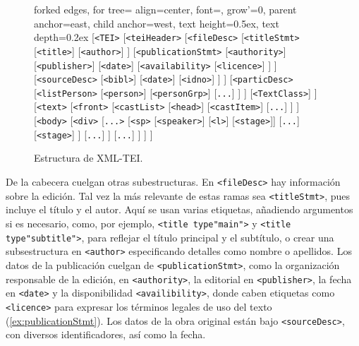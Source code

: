 	\begin{figure}[!ht]
		\begin{forest}
			forked edges,
			for tree={
				align=center,
				font=\tiny,
				grow'=0, %
				parent anchor=east, child anchor=west, %
				text height=0.5ex, text depth=0.2ex %
			}
			[\texttt{<TEI>}
			[\texttt{<teiHeader>}
			[\texttt{<fileDesc>}
			[\texttt{<titleStmt>}
			[\texttt{<title>}]
			[\texttt{<author>}]
			]
			[\texttt{<publicationStmt>}
			[\texttt{<authority>}]
			[\texttt{<publisher>}]
			[\texttt{<date>}]
			[\texttt{<availability>}
			[\texttt{<licence>}]
			]
			]
			[\texttt{<sourceDesc>}
			[\texttt{<bibl>}]
			[\texttt{<date>}]
			[\texttt{<idno>}]
			]
			]
			[\texttt{<particDesc>}
			[\texttt{<listPerson>}
			[\texttt{<person>}]
			[\texttt{<personGrp>}]
			[\texttt{...}]		
			]
			]
			[\texttt{<TextClass>}]
			]
			[\texttt{<text>}
			[\texttt{<front>}
			[\texttt{<castList>}
			[\texttt{<head>}]
			[\texttt{<castItem>}]
			[\texttt{...}]
			]
			]
			[\texttt{<body>}
			[\texttt{<div>}
			[\texttt{...>}
			[\texttt{<sp>}
			[\texttt{<speaker>}]
			[\texttt{<l>}]
			[\texttt{<stage>}]]
			[\texttt{...}]
			[\texttt{<stage>}]
			]
			[\texttt{...}]
			]
			[\texttt{...}]
			]
			]
			]
		\end{forest}
		\caption{Estructura de XML-TEI.}
		\label{fig:xmltei}
	\end{figure}

De la cabecera cuelgan otras subestructuras. En \texttt{<fileDesc>} hay información sobre la edición. Tal vez la más relevante de estas ramas sea \texttt{<titleStmt>}, pues incluye el título y el autor. Aquí se usan varias etiquetas, añadiendo argumentos si es necesario, como, por ejemplo, \texttt{<title type"main">} y \texttt{<title type"subtitle">}, para reflejar el título principal y el subtítulo, o crear una subsestructura en  \texttt{<author>} especificando detalles como nombre o apellidos. Los datos de la publicación cuelgan de \texttt{<publicationStmt>}, como la organización responsable de  la edición, en \texttt{<authority>}, la editorial en \texttt{<publisher>}, la fecha en \texttt{<date>} y la disponibilidad \texttt{<availibility>}, donde caben etiquetas como \texttt{<licence>} para expresar los términos legales de uso del texto (\ref{ex:publicationStmt}). Los datos de la obra original están bajo \texttt{<sourceDesc>}, con diversos identificadores, así como la fecha.

